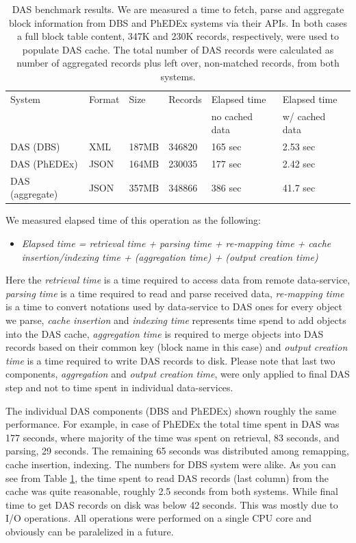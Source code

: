 \documentclass[a4paper]{jpconf}
\begin{document}
\begin{table}[hbt]
\centering
\begin{tabular}{llllll}\hline
\hline

System & Format & Size & Records & Elapsed time & Elapsed time \\
& & & & no cached data & w/ cached data \\
\hline
DAS (DBS) & XML & 187MB & 346820 & 165 sec & 2.53 sec \\
DAS (PhEDEx) & JSON & 164MB & 230035 & 177 sec & 2.42 sec \\
DAS (aggregate) & JSON & 357MB & 348866 & 386 sec & 41.7 sec \\
\hline
\hline
\end{tabular}
\caption{DAS benchmark results. 
We are measured a time to fetch, parse and aggregate block information
from DBS and PhEDEx systems via their APIs. In both cases a full block 
table content, 347K and 230K records, respectively, were used to populate
DAS cache. The total number of DAS records were calculated
as number of aggregated records plus left over, non-matched records,
from both systems.}
\label{DAS_benchmark}
\end{table}

We measured elapsed time of this operation as the following:
\begin{itemize}
\item[]
{\it
Elapsed time = retrieval time + parsing time + re-mapping time 
        + cache insertion/indexing time 
        + (aggregation time) + (output creation time)
}
\end{itemize}
Here the {\it retrieval time} is a time required to access data from remote data-service,
{\it parsing time} is a time required to read and parse received data, {\it re-mapping time}
is a time to convert notations used by data-service to DAS ones for every object
we parse, {\it cache insertion} and {\it indexing time} represents time spend to add objects into
the DAS cache, {\it aggregation time} is required to merge objects into DAS records based
on their common key (block name in this case) and {\it output creation time}
is a time required to write DAS records to disk. Please note that last two
components, {\it aggregation} and {\it output creation time}, were only applied to
final DAS step and not to time spent in individual data-services.

The individual DAS components (DBS and PhEDEx) shown roughly the same performance.
For example, in case of PhEDEx the total time spent in DAS was 177 seconds, where
majority of the time was spent on retrieval, 83 seconds, and parsing, 29 seconds.
The remaining 65 seconds was distributed among remapping, cache insertion, indexing. The
numbers for DBS system were alike. As you can see from Table \ref{DAS_benchmark},
the time spent to read DAS records (last column) from the cache was quite
reasonable, roughly 2.5 seconds from both systems. While final time to
get DAS records on disk was below 42 seconds. This was mostly due to I/O operations.
All operations were performed on a single CPU core and obviously can be
paralelized in a future.
\end{document}
